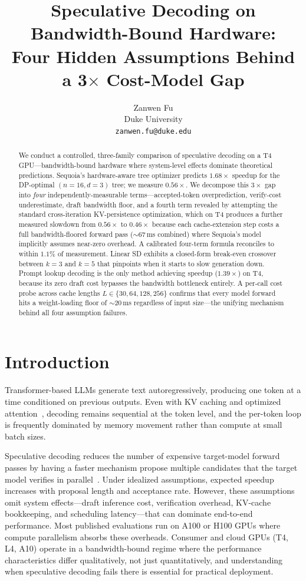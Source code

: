 \documentclass[letterpaper,twocolumn,10pt]{article}
\title{Speculative Decoding on Bandwidth-Bound Hardware:\\
Four Hidden Assumptions Behind a 3$\times$ Cost-Model Gap}
\author{
{\rm Zanwen Fu}\\
Duke University\\
\texttt{zanwen.fu@duke.edu}
}
\begin{document}
\maketitle

\begin{abstract}
We conduct a controlled, three-family comparison of speculative decoding on a T4 GPU---bandwidth-bound hardware where system-level effects dominate theoretical predictions.
Sequoia's hardware-aware tree optimizer predicts $1.68\times$ speedup for the DP-optimal $(n{=}16, d{=}3)$ tree; we measure $0.56\times$.
We decompose this $3\times$ gap into \emph{four} independently-measurable terms---accepted-token overprediction, verify-cost underestimate, draft bandwidth floor, and a fourth term revealed by attempting the standard cross-iteration KV-persistence optimization, which on T4 produces a further measured slowdown from $0.56\times$ to $0.46\times$ because each cache-extension step costs a full bandwidth-floored forward pass ($\sim$67\,ms combined) where Sequoia's model implicitly assumes near-zero overhead.
A calibrated four-term formula reconciles to within $1.1\%$ of measurement.
Linear SD exhibits a closed-form break-even crossover between $k{=}3$ and $k{=}5$ that pinpoints when it starts to slow generation down.
Prompt lookup decoding is the only method achieving speedup ($1.39\times$) on T4, because its zero draft cost bypasses the bandwidth bottleneck entirely.
A per-call cost probe across cache lengths $L \in \{30, 64, 128, 256\}$ confirms that every model forward hits a weight-loading floor of $\sim$20\,ms regardless of input size---the unifying mechanism behind all four assumption failures.
\end{abstract}

\section{Introduction}

Transformer-based LLMs generate text autoregressively, producing one token at a time conditioned on previous outputs.
Even with KV caching and optimized attention~\cite{flashattention}, decoding remains sequential at the token level, and the per-token loop is frequently dominated by memory movement rather than compute at small batch sizes.

Speculative decoding reduces the number of expensive target-model forward passes by having a faster mechanism propose multiple candidates that the target model verifies in parallel~\cite{leviathan2023speculative}.
Under idealized assumptions, expected speedup increases with proposal length and acceptance rate.
However, these assumptions omit system effects---draft inference cost, verification overhead, KV-cache bookkeeping, and scheduling latency---that can dominate end-to-end performance.
Most published evaluations run on A100 or H100 GPUs where compute parallelism absorbs these overheads.
Consumer and cloud GPUs (T4, L4, A10) operate in a bandwidth-bound regime where the performance characteristics differ qualitatively, not just quantitatively, and understanding when speculative decoding fails there is essential for practical deployment.
\end{document}
